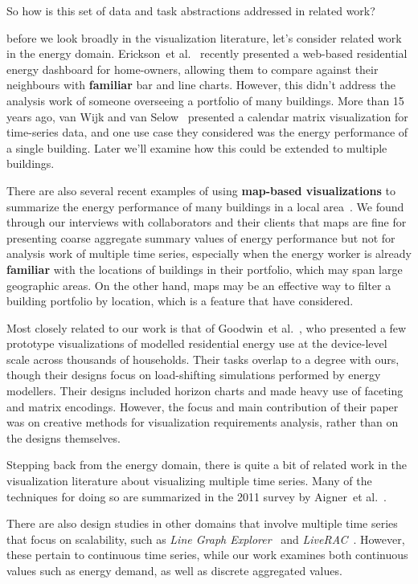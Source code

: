 \documentclass[journal]{vgtc}                %
\newcommand{\bstart}[1]{\vspace{1mm} \noindent{\textbf{#1:}}}
\newcommand{\etal}{et al.}
\begin{document}
So how is this set of data and task abstractions addressed in related work?

\bstart{Energy visualization} before we look broadly in the visualization literature, let's consider related work in the energy domain.
Erickson~\etal~\cite{Erickson2013} recently presented a web-based residential energy dashboard for home-owners, allowing them to compare against their neighbours with {\bf familiar} bar and line charts. 
However, this didn't address the analysis work of someone overseeing a portfolio of many buildings.
More than 15 years ago, van Wijk and van Selow~\cite{vanWijk1999} presented a calendar matrix visualization for time-series data, and one use case they considered was the energy performance of a single building.
Later we'll examine how this could be extended to multiple buildings.

There are also several recent examples of using {\bf map-based visualizations} to summarize the energy performance of many buildings in a local area~\cite{Heat2014,MEP2014}.
We found through our interviews with collaborators and their clients that maps are fine for presenting coarse aggregate summary values of energy performance but not for analysis work of multiple time series, especially when the energy worker is already {\bf familiar} with the locations of buildings in their portfolio, which may span large geographic areas. 
On the other hand, maps may be an effective way to filter a building portfolio by location, which is a feature that have considered.

Most closely related to our work is that of Goodwin~\etal~\cite{Goodwin2013}, who presented a few prototype visualizations of modelled residential energy use at the device-level scale across thousands of households. 
Their tasks overlap to a degree with ours, though their designs focus on load-shifting simulations performed by energy modellers. 
Their designs included horizon charts and made heavy use of faceting and matrix encodings. 
However, the focus and main contribution of their paper was on creative methods for visualization requirements analysis, rather than on the designs themselves.

\bstart{Multiple time-series visualization} Stepping back from the energy domain, there is quite a bit of related work in the visualization literature about visualizing multiple time series. 
Many of the techniques for doing so are summarized in the 2011 survey by Aigner~\etal~\cite{Aigner2011}.

There are also design studies in other domains that involve multiple time series that focus on scalability, such as {\it Line Graph Explorer}~\cite{Lam2007} and {\it LiveRAC}~\cite{McLachlan2008}. 
However, these pertain to continuous time series, while our work examines both continuous values such as energy demand, as well as discrete aggregated values.
\end{document}
